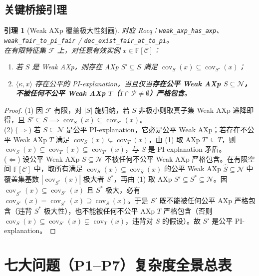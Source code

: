 \documentclass[11pt,a4paper]{article}
\newtheorem{lemma}[theorem]{引理}
\newcommand{\F}{\mathbb{F}}
\newcommand{\C}{\mathcal{C}}
\newcommand{\N}{\mathcal{N}}
\newcommand{\Prot}{\mathcal{P}}
\newcommand{\cov}{\operatorname{cov}}
\newcommand{\code}[1]{\texttt{\small #1}}
\begin{document}
\subsection{关键桥接引理}
\begin{lemma}[Weak AXp 覆盖极大性刻画]
\noindent\emph{对应 Rocq：\code{weak\_axp\_has\_axp}、\code{weak\_fair\_to\_pi\_fair} / \code{dec\_exist\_fair\_at\_to\_pi}}。\\
在有限特征集 $\mathcal{F}$ 上，对任意有效实例 $x \in \F[\C]$：
\begin{enumerate}
  \item 若 $S$ 是 Weak AXp，则存在 AXp $S' \subseteq S$ 满足 $\cov_S(x) \subseteq \cov_{S'}(x)$；
  \item $\langle \kappa, x \rangle$ 存在公平的 PI-explanation，当且仅当\textbf{存在公平 Weak AXp $S \subseteq \N$，不被任何不公平 Weak AXp $T$（$T \cap \Prot \neq \emptyset$）严格包含}。
\end{enumerate}
\end{lemma}
\begin{proof}
(1) 因 $\mathcal{F}$ 有限，对 $|S|$ 施归纳，若 $S$ 非极小则取真子集 Weak AXp 递降即得，且 $S' \subseteq S \implies \cov_S(x) \subseteq \cov_{S'}(x)$。\\
(2) ($\Rightarrow$) 若 $S \subseteq \N$ 是公平 PI-explanation，它必是公平 Weak AXp；若存在不公平 Weak AXp $T$ 满足 $\cov_S(x) \subsetneq \cov_T(x)$，由 (1) 取 AXp $T' \subseteq T$，则 $\cov_S(x) \subsetneq \cov_T(x) \subseteq \cov_{T'}(x)$，与 $S$ 是 PI-explanation 矛盾。\\
($\Leftarrow$) 设公平 Weak AXp $S \subseteq \N$ 不被任何不公平 Weak AXp 严格包含。在有限空间 $\F[\C]$ 中，取所有满足 $\cov_S(x) \subseteq \cov_{\hat{S}}(x)$ 的公平 Weak AXp $\hat{S} \subseteq \N$ 中覆盖集基数 $|\cov_{S^*}(x)|$ 极大者 $S^*$，再由 (1) 取 AXp $S' \subseteq S^* \subseteq \N$。因 $\cov_{S^*}(x) \subseteq \cov_{S'}(x)$ 且 $S^*$ 极大，必有 $\cov_{S'}(x) = \cov_{S^*}(x) \supseteq \cov_S(x)$。于是 $S'$ 既不能被任何公平 AXp 严格包含（违背 $S^*$ 极大性），也不能被任何不公平 AXp $T$ 严格包含（否则 $\cov_S(x) \subseteq \cov_{S'}(x) \subsetneq \cov_T(x)$，违背对 $S$ 的假设）。故 $S'$ 是公平 PI-explanation。
\end{proof}

\section{七大问题（P1--P7）复杂度全景总表}
\end{document}
